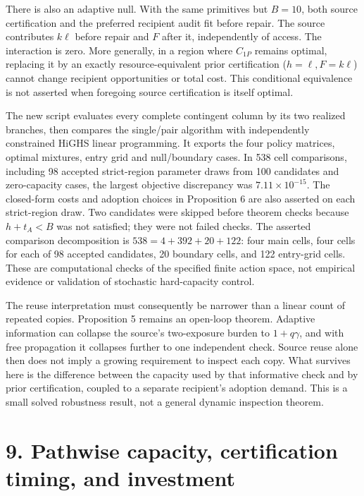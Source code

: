 \documentclass[
  11pt,
  a4paper,
]{article}
\begin{document}
There is also an adaptive null. With the same primitives but \(B=10\),
both source certification and the preferred recipient audit fit before
repair. The source contributes \(k\ell\) before repair and \(F\) after
it, independently of access. The interaction is zero. More generally, in
a region where \(C_{1P}\) remains optimal, replacing it by an exactly
resource-equivalent prior certification (\(h=\ell,F=k\ell\)) cannot
change recipient opportunities or total cost. This conditional
equivalence is not asserted when foregoing source certification is
itself optimal.

The new script evaluates every complete contingent column by its two
realized branches, then compares the single/pair algorithm with
independently constrained HiGHS linear programming. It exports the four
policy matrices, optimal mixtures, entry grid and null/boundary cases.
In 538 cell comparisons, including 98 accepted strict-region parameter
draws from 100 candidates and zero-capacity cases, the largest objective
discrepancy was \(7.11\times10^{-15}\). The closed-form costs and
adoption choices in Proposition 6 are also asserted on each
strict-region draw. Two candidates were skipped before theorem checks
because \(h+t_A<B\) was not satisfied; they were not failed checks. The
asserted comparison decomposition is \(538=4+392+20+122\): four main
cells, four cells for each of 98 accepted candidates, 20 boundary cells,
and 122 entry-grid cells. These are computational checks of the
specified finite action space, not empirical evidence or validation of
stochastic hard-capacity control.

The reuse interpretation must consequently be narrower than a linear
count of repeated copies. Proposition 5 remains an open-loop theorem.
Adaptive information can collapse the source's two-exposure burden to
\(1+q\gamma\), and with free propagation it collapses further to one
independent check. Source reuse alone then does not imply a growing
requirement to inspect each copy. What survives here is the difference
between the capacity used by that informative check and by prior
certification, coupled to a separate recipient's adoption demand. This
is a small solved robustness result, not a general dynamic inspection
theorem.

\hypertarget{pathwise-capacity-certification-timing-and-investment}{%
\section{9. Pathwise capacity, certification timing, and
investment}\label{pathwise-capacity-certification-timing-and-investment}}
\end{document}
